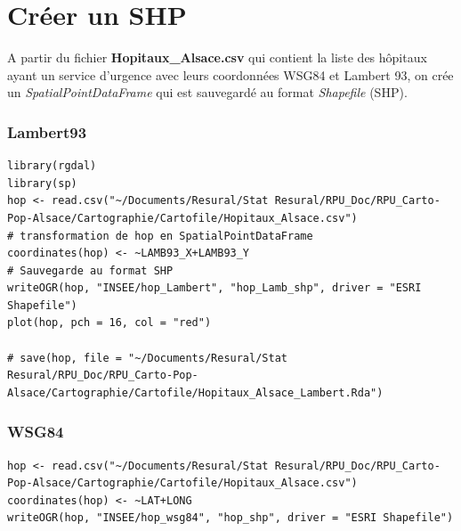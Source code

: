 \documentclass[]{article}
\begin{document}
\section{Créer un SHP}\label{creer-un-shp}

A partir du fichier \textbf{Hopitaux\_Alsace.csv} qui contient la liste
des hôpitaux ayant un service d'urgence avec leurs coordonnées WSG84 et
Lambert 93, on crée un \emph{SpatialPointDataFrame} qui est sauvegardé
au format \emph{Shapefile} (SHP).

\subsubsection{Lambert93}\label{lambert93}

\begin{verbatim}
library(rgdal)
library(sp)
hop <- read.csv("~/Documents/Resural/Stat Resural/RPU_Doc/RPU_Carto-Pop-Alsace/Cartographie/Cartofile/Hopitaux_Alsace.csv")
# transformation de hop en SpatialPointDataFrame
coordinates(hop) <- ~LAMB93_X+LAMB93_Y
# Sauvegarde au format SHP
writeOGR(hop, "INSEE/hop_Lambert", "hop_Lamb_shp", driver = "ESRI Shapefile")
plot(hop, pch = 16, col = "red")

# save(hop, file = "~/Documents/Resural/Stat Resural/RPU_Doc/RPU_Carto-Pop-Alsace/Cartographie/Cartofile/Hopitaux_Alsace_Lambert.Rda")
\end{verbatim}

\subsubsection{WSG84}\label{wsg84}

\begin{verbatim}
hop <- read.csv("~/Documents/Resural/Stat Resural/RPU_Doc/RPU_Carto-Pop-Alsace/Cartographie/Cartofile/Hopitaux_Alsace.csv")
coordinates(hop) <- ~LAT+LONG
writeOGR(hop, "INSEE/hop_wsg84", "hop_shp", driver = "ESRI Shapefile")
\end{verbatim}
\end{document}

